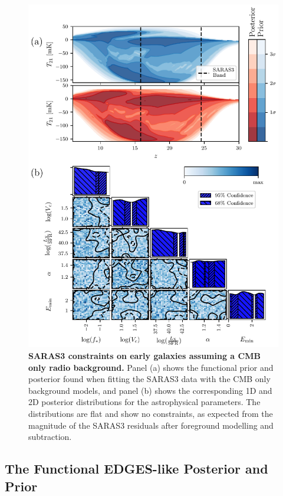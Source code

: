\begin{figure}[ht!]
    \centering
    \includegraphics{saras3/figs/FigureS5.pdf}
    \caption{\textbf{SARAS3 constraints on early galaxies assuming a CMB only radio background.} Panel (a) shows the functional prior and posterior found when fitting the SARAS3 data with the CMB only background models, and panel (b) shows the corresponding 1D and 2D posterior distributions for the astrophysical parameters. The distributions are flat and show no constraints, as expected from the magnitude of the SARAS3 residuals after foreground modelling and subtraction.}
    \label{fig:sta_results}
\end{figure}

\subsection{The Functional EDGES-like Posterior and Prior}

